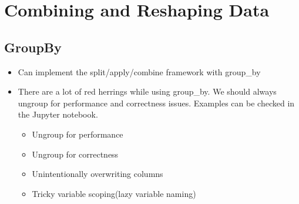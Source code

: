 \section{Combining and Reshaping Data}

\subsection{GroupBy}
\begin{itemize}
    \item Can implement the split/apply/combine framework with group\_by
    \item There are a lot of red herrings while using group\_by. We should always ungroup for performance and correctness issues. Examples can be checked in the Jupyter notebook.
    \begin{itemize}
        \item Ungroup for performance
        \item Ungroup for correctness
        \item Unintentionally overwriting columns
        \item Tricky variable scoping(lazy variable naming)
    \end{itemize}
\end{itemize}

